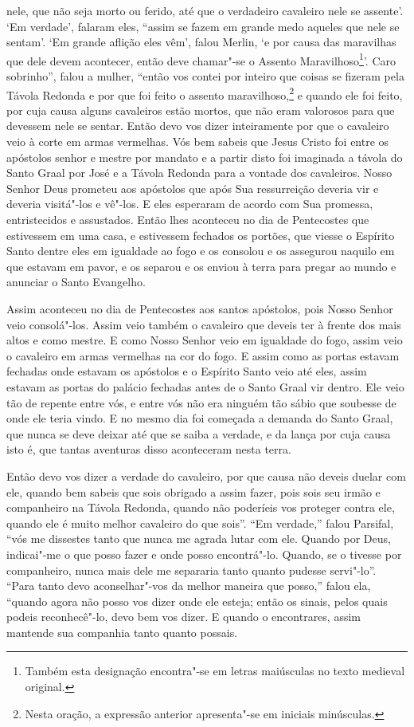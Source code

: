 nele, que não seja morto ou ferido, até que o verdadeiro cavaleiro nele se
assente’. ‘Em verdade’, falaram eles, “assim se fazem em grande medo aqueles
que nele se sentam’. ‘Em grande aflição eles vêm’, falou Merlin, ‘e por causa
das maravilhas que dele devem acontecer, então deve chamar"-se o Assento
Maravilhoso\footnote{ Também esta designação encontra"-se em letras maiúsculas
no texto medieval original.}’. Caro sobrinho”, falou a mulher,
“então vos contei por inteiro que coisas se fizeram pela Távola Redonda e por
que foi feito o assento maravilhoso,\footnote{ Nesta oração, a expressão
anterior apresenta"-se em iniciais minúsculas.}  e quando ele foi
feito, por cuja causa alguns cavaleiros estão mortos, que não eram valorosos
para que devessem nele se sentar. Então devo vos dizer inteiramente por que o
cavaleiro veio à corte em armas vermelhas. Vós bem sabeis que Jesus Cristo foi
entre os apóstolos senhor e mestre por mandato e a partir disto foi imaginada a
távola do Santo Graal por José e a Távola Redonda para a vontade dos
cavaleiros. Nosso Senhor Deus prometeu aos apóstolos que após Sua ressurreição
deveria vir e deveria visitá"-los e vê"-los. E eles esperaram de acordo com Sua
promessa, entristecidos e assustados. Então lhes aconteceu no dia de
Pentecostes que estivessem em uma casa, e estivessem fechados os portões, que
viesse o Espírito Santo dentre eles em igualdade ao fogo e os consolou e os
assegurou naquilo em que estavam em pavor, e os separou e os enviou à terra
para pregar ao mundo e anunciar o Santo Evangelho.

Assim aconteceu no dia de Pentecostes aos santos apóstolos, pois Nosso
Senhor veio consolá"-los. Assim veio também o cavaleiro que deveis ter à frente
dos mais altos e como mestre.  E como Nosso Senhor veio em igualdade do fogo,
assim veio o cavaleiro em armas vermelhas na cor do fogo. E assim como as
portas estavam fechadas onde estavam os apóstolos e o Espírito Santo veio até
eles, assim estavam as portas do palácio fechadas antes de o Santo Graal vir
dentro. Ele veio tão de repente entre vós, e entre vós não era ninguém tão
sábio que soubesse de onde ele teria vindo. E no mesmo dia foi começada a
demanda do Santo Graal, que nunca se deve deixar até que se saiba a verdade, e
da lança por cuja causa isto é, que tantas aventuras disso aconteceram nesta
terra. 

Então devo vos dizer a verdade do cavaleiro, por que causa não deveis duelar
com ele, quando bem sabeis que sois obrigado a assim fazer, pois sois seu irmão
e companheiro na Távola Redonda, quando não poderíeis vos proteger contra ele,
quando ele é muito melhor cavaleiro do que sois”. “Em
verdade,” falou Parsifal, “vós me dissestes tanto que nunca me agrada lutar
com ele. Quando por Deus, indicai"-me o que posso fazer e onde posso
encontrá"-lo. Quando, se o tivesse por companheiro, nunca mais dele me separaria
tanto quanto pudesse servi"-lo”. “Para tanto devo aconselhar"-vos da
melhor maneira que posso,” falou ela, “quando agora não posso vos dizer onde
ele esteja; então os sinais, pelos quais podeis reconhecê"-lo, devo bem vos
dizer. E quando o encontrares, assim mantende sua companhia tanto quanto
possais. 

